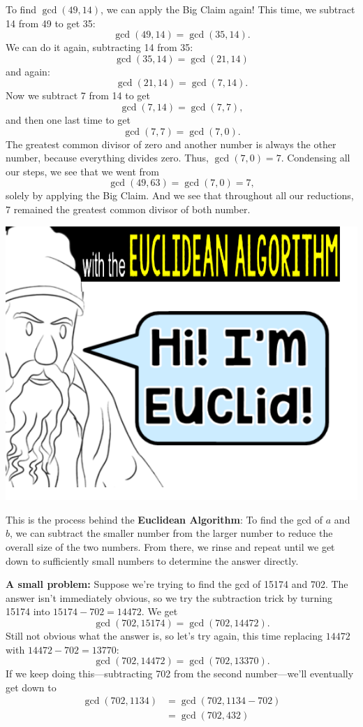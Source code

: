 \documentclass{article}
\begin{document}
To find $\gcd(49, 14)$, we can apply the Big Claim again! This time, we subtract 14 from 49 to get 35:
$$\gcd(49, 14) = \gcd(35, 14).$$
We can do it again, subtracting 14 from 35:
$$\gcd(35, 14) = \gcd(21, 14)$$
and again:
$$\gcd(21, 14) = \gcd(7, 14).$$
Now we subtract 7 from 14 to get
$$\gcd(7, 14) = \gcd(7, 7),$$
and then one last time to get
$$\gcd(7, 7) = \gcd(7, 0).$$
The greatest common divisor of zero and another number is always the other number, because everything divides zero. Thus, $\gcd(7, 0) = 7$. Condensing all our steps, we see that we went from
$$\gcd(49, 63) = \gcd(7, 0) = 7,$$
solely by applying the Big Claim. And we see that throughout all our reductions, 7 remained the greatest common divisor of both number.

\begin{center}
\includegraphics[scale=0.7]{images/euclidean.png}
\end{center}

This is the process behind the \textbf{Euclidean Algorithm}: To find the gcd of $a$ and $b$, we can subtract the smaller number from the larger number to reduce the overall size of the two numbers. From there, we rinse and repeat until we get down to sufficiently small numbers to determine the answer directly.

\textbf{A small problem:} Suppose we're trying to find the gcd of 15174 and 702. The answer isn't immediately obvious, so we try the subtraction trick by turning 15174 into $15174 - 702 = 14472$. We get
$$\gcd(702, 15174) = \gcd(702, 14472).$$
Still not obvious what the answer is, so let's try again, this time replacing $14472$ with $14472 - 702 = 13770$:
$$\gcd(702, 14472) = \gcd(702, 13370).$$
If we keep doing this---subtracting 702 from the second number---we'll eventually get down to
\begin{align*}
\gcd(702, 1134) & = \gcd(702, 1134 - 702) \\
    & = \gcd(702, 432)
\end{align*}
\end{document}
